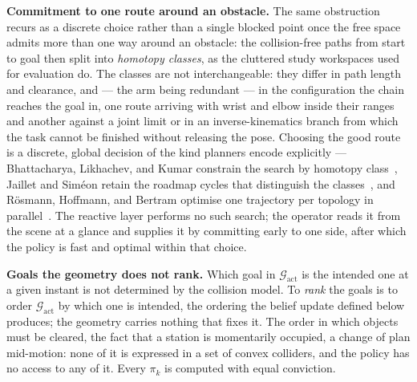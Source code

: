 \textbf{Commitment to one route around an obstacle.} The same obstruction recurs as a discrete choice rather than a single blocked point once the free space admits more than one way around an obstacle: the collision-free paths from start to goal then split into \emph{homotopy classes}, as the cluttered study workspaces used for evaluation do. The classes are not interchangeable: they differ in path length and clearance, and --- the arm being redundant --- in the configuration the chain reaches the goal in, one route arriving with wrist and elbow inside their ranges and another against a joint limit or in an inverse-kinematics branch from which the task cannot be finished without releasing the pose. Choosing the good route is a discrete, global decision of the kind planners encode explicitly --- Bhattacharya, Likhachev, and Kumar constrain the search by homotopy class~\cite{bhattacharya2012topological}, Jaillet and Sim\'eon retain the roadmap cycles that distinguish the classes~\cite{jaillet2008deformation}, and R\"osmann, Hoffmann, and Bertram optimise one trajectory per topology in parallel~\cite{rosmann2017topologies}. The reactive layer performs no such search; the operator reads it from the scene at a glance and supplies it by committing early to one side, after which the policy is fast and optimal within that choice.

\textbf{Goals the geometry does not rank.} Which goal in $\mathcal{G}_{\text{act}}$ is the intended one at a given instant is not determined by the collision model. To \emph{rank} the goals is to order $\mathcal{G}_{\text{act}}$ by which one is intended, the ordering the belief update defined below produces; the geometry carries nothing that fixes it. The order in which objects must be cleared, the fact that a station is momentarily occupied, a change of plan mid-motion: none of it is expressed in a set of convex colliders, and the policy has no access to any of it. Every $\pi_k$ is computed with equal conviction.

